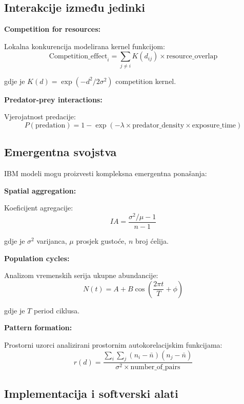 \documentclass[11pt,oneside]{book}
\begin{document}
\subsection{Interakcije između jedinki}

\textbf{Competition for resources:}

Lokalna konkurencija modelirana kernel funkcijom:
\begin{equation}
	\text{Competition\_effect}_i = \sum_{j \neq i} K(d_{ij}) \times \text{resource\_overlap}
\end{equation}

gdje je $K(d) = \exp(-d^2/2\sigma^2)$ competition kernel.

\textbf{Predator-prey interactions:}

Vjerojatnost predacije:
\begin{equation}
	P(\text{predation}) = 1 - \exp(-\lambda \times \text{predator\_density} \times \text{exposure\_time})
\end{equation}

\subsection{Emergentna svojstva}

IBM modeli mogu proizvesti kompleksna emergentna ponašanja:

\textbf{Spatial aggregation:}

Koeficijent agregacije:
\begin{equation}
	IA = \frac{\sigma^2/\mu - 1}{n-1}
\end{equation}

gdje je $\sigma^2$ varijanca, $\mu$ prosjek gustoće, $n$ broj ćelija.

\textbf{Population cycles:}

Analizom vremenskih serija ukupne abundancije:
\begin{equation}
	N(t) = A + B \cos\left(\frac{2\pi t}{T} + \phi\right)
\end{equation}

gdje je $T$ period ciklusa.

\textbf{Pattern formation:}

Prostorni uzorci analizirani prostornim autokorelacijskim funkcijama:
\begin{equation}
	r(d) = \frac{\sum_i \sum_j (n_i - \bar{n})(n_j - \bar{n})}{\sigma^2 \times \text{number\_of\_pairs}}
\end{equation}

\subsection{Implementacija i softverski alati}
\end{document}
